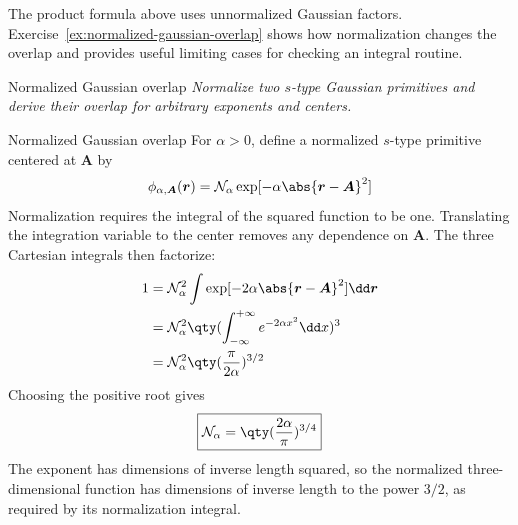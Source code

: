 \documentclass[11pt,a4paper,titlepage]{article}
\numberwithin{equation}{section}
\newcommand{\br}{\boldsymbol{r}}
\newcommand{\bA}{\boldsymbol{A}}
\newcommand{\violet}[1]{\textcolor{hfViolet}{#1}}
\begin{document}
The product formula above uses unnormalized Gaussian factors.
Exercise~\ref{ex:normalized-gaussian-overlap} shows how normalization changes the overlap and provides useful
limiting cases for checking an integral routine.

\begin{hfexercise}[phantom={\label{ex:normalized-gaussian-overlap}}]{Normalized Gaussian overlap}
\violet{\textit{Normalize two $s$-type Gaussian primitives and derive their
overlap for arbitrary exponents and centers.}}
\end{hfexercise}
\begin{hfsolution}{Normalized Gaussian overlap}
For $\alpha>0$, define a normalized $s$-type primitive centered at $\bA$ by
\begin{equation}
  \phi_{\alpha,\bA}(\br)
  =\mathcal{N}_\alpha\exp[-\alpha\abs{\br-\bA}^2]
\end{equation}
Normalization requires the integral of the squared function to be one.
Translating the integration variable to the center removes any dependence
on $\bA$. The three Cartesian integrals then factorize:
\begin{equation}
\begin{split}
  1
  &=\mathcal{N}_\alpha^2
    \int\exp[-2\alpha\abs{\br-\bA}^2]\dd\br\\
  &=\mathcal{N}_\alpha^2
    \qty(\int_{-\infty}^{+\infty}e^{-2\alpha x^2}\dd x)^3\\
  &=\mathcal{N}_\alpha^2\qty(\frac{\pi}{2\alpha})^{3/2}
\end{split}
\end{equation}
Choosing the positive root gives
\begin{equation}
  \boxed{\mathcal{N}_\alpha=\qty(\frac{2\alpha}{\pi})^{3/4}}
\end{equation}
The exponent has dimensions of inverse length squared, so the normalized
three-dimensional function has dimensions of inverse length to the power
$3/2$, as required by its normalization integral.


\end{hfsolution}
\end{document}
